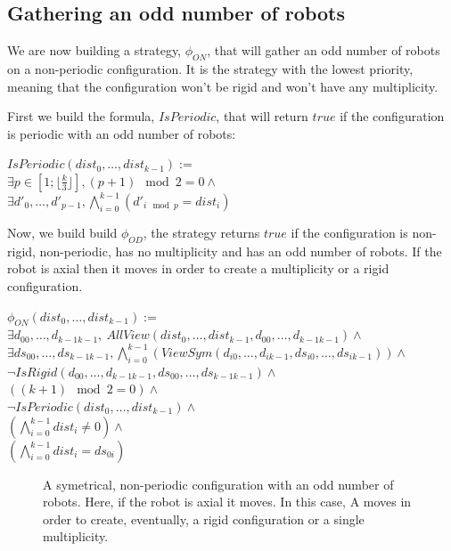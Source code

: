 \documentclass{article}
\begin{document}
\subsection{Gathering an odd number of robots}

We are now building a strategy, $\phi_{ON}$, that will gather an odd number of robots on a non-periodic configuration. It is the strategy with the lowest priority, meaning that the configuration won't be rigid and won't have any multiplicity.

First we build the formula, $IsPeriodic$, that will return $true$ if the configuration is periodic with an odd number of robots:

\begin{center}
    
$IsPeriodic (dist_{0}, \ldots , dist_{k-1}):=$\\
$\exists p \in [1; \lfloor \frac{k}{3} \rfloor ],  (p+1) \mod{2} = 0 \land $\\
$\exists d'_{0}, \ldots , d'_{p-1}, \bigwedge_{i=0}^{k-1}  (d'_{i\mod{p}} = dist_{i})$
\end{center}

Now, we build build $\phi_{OD}$, the strategy returns $true$ if the configuration is non-rigid, non-periodic, has no multiplicity and has an odd number of robots. If the robot is axial then it moves in order to create a multiplicity or a rigid configuration.

\begin{center}
    
$\phi_{ON} (dist_{0}, \ldots , dist_{k-1}):=$\\
$\exists d_{00}, \ldots ,d_{k-1k-1},\ AllView (dist_{0}, \ldots ,dist_{k-1}, d_{00}, \ldots ,d_{k-1k-1})\land$\\
$\exists ds_{00}, \ldots ,ds_{k-1k-1}, \bigwedge_{i=0}^{k-1}  (ViewSym (d_{i0}, \ldots , d_{ik-1}, ds_{i0}, \ldots , ds_{ik-1}))\land$\\
$\lnot IsRigid (d_{00}, \ldots ,d_{k-1k-1}, ds_{00}, \ldots ,ds_{k-1k-1}) \land $\\
$ ( (k+1) \mod{2} = 0) \land $\\
$\lnot IsPeriodic (dist_{0}, \ldots , dist_{k-1}) \land $\\
$ (\bigwedge_{i=0}^{k-1} dist_{i} \not= 0) \land $\\
$ (\bigwedge_{i=0}^{k-1} dist_{i} = ds_{0i})$
\end{center}

\begin{figure}[!hp]
    \centering
    \def\svgscale{0.3}
    
    \caption{A symetrical, non-periodic configuration with an odd number of robots. Here, if the robot is axial it moves. In this case, A moves in order to create, eventually, a rigid configuration or a single multiplicity.}
    \label{dessinOdd}
\end{figure}
\end{document}
